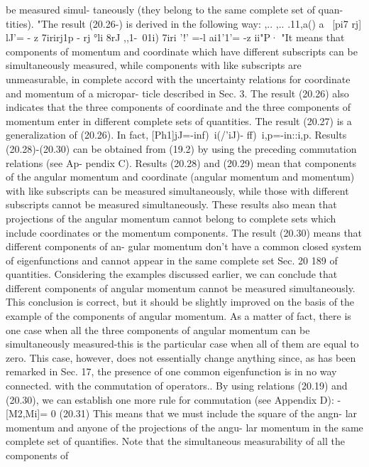 \documentclass[a4paper,sfsidenotes,colorlinks=true]{tufte-book}
\numberwithin{equation}{section}
\numberwithin{figure}{section}
\begin{document}
{  be measured simul- taneously (they belong to the same complete set
  of quan- tities).  "The result (20.26-) is derived in the following
  way: ,.. ,.. .11,a() a ~[pi7 rj] lJ'= - z 7irirj1p - rj °li 8rJ
  ,,1-\ 01i{) 7iri '!' =-l ai1'1'= -z ii"P· "It means that components
    of momentum and coordinate which have different subscripts can be
    simultaneously measured, while components with like subscripts are
    unmeasurable, in complete accord with the uncertainty relations
    for coordinate and momentum of a micropar- ticle described in
    Sec. 3. The result (20.26) also indicates that the three
    components of coordinate and the three components of momentum
    enter in different complete sets of quantities. The result (20.27)
    is a generalization of (20.26). In fact, [Ph1]jJ=-in{f)~i(/'iJ)-
      ff)~i,p}=-in::i,p.  Results (20.28)-(20.30) can be obtained from
    (19.2) by using the preceding commutation relations (see Ap-
    pendix C). Results (20.28) and (20.29) mean that components of the
    angular momentum and coordinate (angular momentum and momentum)
    with like subscripts can be measured simultaneously, while those
    with different subscripts cannot be measured simultaneously. These
    results also mean that projections of the angular momentum cannot
    belong to complete sets which include coordinates or the momentum
    components. The result (20.30) means that different components of
    an- gular momentum don't have a common closed system of
    eigenfunctions and cannot appear in the same complete set Sec. 20
    189 of quantities. Considering the examples discussed earlier, we
    can conclude that different components of angular momentum cannot
    be measured simultaneously. This conclusion is correct, but it
    should be slightly improved on the basis of the example of the
    components of angular momentum. As a matter of fact, there is one
    case when all the three components of angular momentum can be
    simultaneously measured-this is the particular case when all of
    them are equal to zero. This case, however, does not essentially
    change anything since, as has been remarked in Sec. 17, the
    presence of one common eigenfunction is in no way connected. with
    the commutation of operators.. By using relations (20.19) and
    (20.30), we can establish one more rule for commutation (see
    Appendix D): -[M2,Mi]= 0 (20.31) This means that we must include
    the square of the angn- lar momentum and anyone of the projections
    of the angu- lar momentum in the same complete set of quantifies.
    Note that the simultaneous measurability of all the components of
}}
\end{document}
